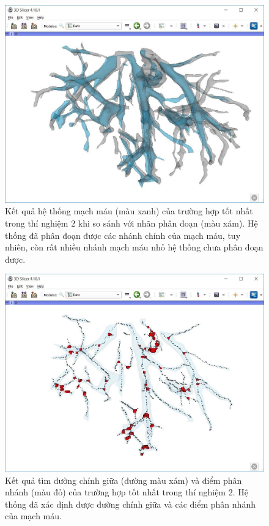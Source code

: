 	\begin{figure}[h!]
		\includegraphics[width=\textwidth]{figures/result_e2_best_comparison}
		\caption[Kết quả hệ thống mạch máu của trường hợp tốt nhất trong thí nghiệm 2 và nhãn phân đoạn.]{Kết quả hệ thống mạch máu (màu xanh) của trường hợp tốt nhất trong thí nghiệm 2 khi so sánh với nhãn phân đoạn (màu xám). Hệ thống đã phân đoạn được các nhánh chính của mạch máu, tuy nhiên, còn rất nhiều nhánh mạch máu nhỏ hệ thống chưa phân đoạn được.}
		\label{fig:result_e2_best_comparison}
	\end{figure}
	\begin{figure}[h!]
		\includegraphics[width=\textwidth]{figures/result_e2_best_skeleton_branching_point}
		\caption[Kết quả tìm đường chính giữa và điểm phân nhánh của trường hợp tốt nhất trong thí nghiệm 2.]{Kết quả tìm đường chính giữa (đường màu xám) và điểm phân nhánh (màu đỏ) của trường hợp tốt nhất trong thí nghiệm 2. Hệ thống đã xác định được đường chính giữa và các điểm phân nhánh của mạch máu.}
		\label{fig:result_e2_best_skeleton_branching_point}
	\end{figure}


